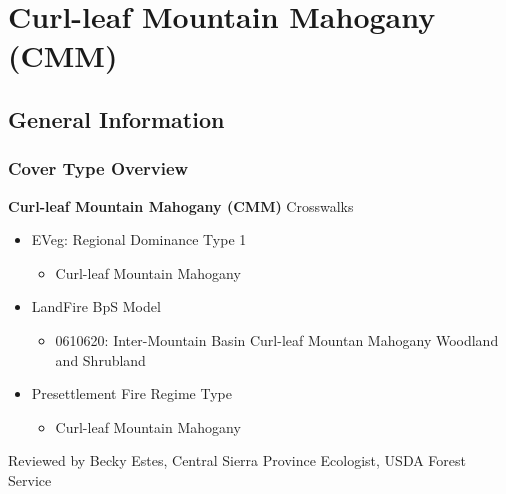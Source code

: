 \newpage
\section{Curl-leaf Mountain Mahogany (CMM)}

\subsection*{General Information}

\subsubsection{Cover Type Overview}

\textbf{Curl-leaf Mountain Mahogany (CMM)}
\newline
Crosswalks
\begin{itemize}
	\item EVeg: Regional Dominance Type 1
	\begin{itemize}
		\item Curl-leaf Mountain Mahogany
	\end{itemize}

	\item LandFire BpS Model
	\begin{itemize}
		\item 0610620: Inter-Mountain Basin Curl-leaf Mountan Mahogany Woodland and Shrubland
	\end{itemize}

	\item Presettlement Fire Regime Type
	\begin{itemize}
		\item Curl-leaf Mountain Mahogany
	\end{itemize}
\end{itemize}

\noindent Reviewed by Becky Estes, Central Sierra Province Ecologist, USDA Forest Service

